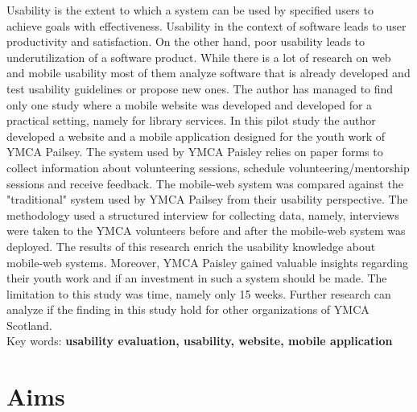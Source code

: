\documentclass[version=last,fontsize=13pt]{scrartcl}
\begin{document}

Usability is the extent to which a system can be used by specified users to achieve goals with effectiveness. Usability in the context of software leads to user productivity and satisfaction. On the other hand, poor usability leads to underutilization of a software product. While there is a lot of research on web and mobile usability most of them analyze software that is already developed and test usability guidelines or propose new ones. The author has managed to find only one study where a mobile website was developed and developed for a practical setting, namely for library services.  In this pilot study the author developed a website and a mobile application designed for the youth work of YMCA Pailsey. The  system used by YMCA Paisley relies on paper forms to collect information about volunteering sessions, schedule volunteering/mentorship sessions and receive feedback. The mobile-web system was compared against the "traditional" system used by YMCA Pailsey from their usability perspective. The methodology used a structured interview for collecting data, namely, interviews were taken to the YMCA volunteers before and after the mobile-web system was deployed. The results of this research enrich the usability knowledge about mobile-web systems. Moreover, YMCA Paisley gained valuable insights regarding their youth work and if an investment in such a system should be made. The limitation to this study was time, namely only 15 weeks. Further research can analyze if the finding in this study hold for other organizations of YMCA Scotland.\\

Key words: \textbf{usability evaluation, usability, website, mobile application}

\section{Aims}
\end{document}
